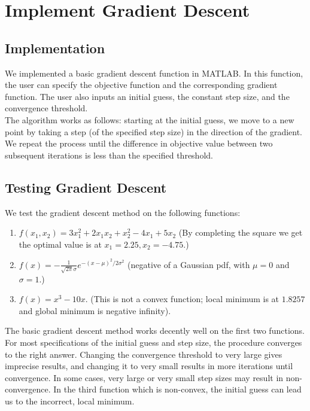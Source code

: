 
\section{Implement Gradient Descent}\label{sec:grad_desc}

\subsection{Implementation}
We implemented a basic gradient descent function in MATLAB. In this function, the user can specify the objective function and the corresponding gradient function. The user also inputs an initial guess, the constant step size, and the convergence threshold. \\
The algorithm works as follows: starting at the initial guess, we move to a new point by taking a step (of the specified step size) in the direction of the gradient. We repeat the process until the difference in objective value between two subsequent iterations is less than the specified threshold.

\subsection{Testing Gradient Descent}
We test the gradient descent method on the following functions:
\begin{enumerate}
\item $f(x_1, x_2) = 3x_1^2 + 2x_1x_2 + x_2^2 - 4x_1 + 5x_2$ (By completing the square we get the optimal value is at $x_1 = 2.25, x_2 = -4.75$.)
\item $f(x) = -\frac{1}{\sqrt{2\pi}\sigma}e^{-(x-\mu)^2/2\sigma^2}$ (negative of a Gaussian pdf, with $\mu = 0$ and $\sigma = 1$.)
\item $f(x) = x^3 - 10x$. (This is not a convex function; local minimum is at $1.8257$ and global minimum is negative infinity).
\end{enumerate}

The basic gradient descent method works decently well on the first two functions. For most specifications of the initial guess and step size, the procedure converges to the right answer. Changing the convergence threshold to very large gives imprecise results, and changing it to very small results in more iterations until convergence. In some cases, very large or very small step sizes may result in non-convergence. In the third function which is non-convex, the initial guess can lead us to the incorrect, local minimum.  

